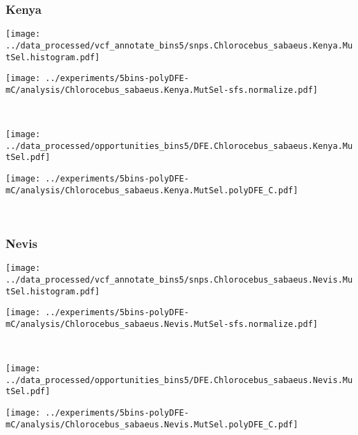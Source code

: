 \subsubsection{Kenya}

\begin{minipage}{0.49\linewidth}
    \texttt{[image: ../data\_processed/vcf\_annotate\_bins5/snps.Chlorocebus\_sabaeus.Kenya.MutSel.histogram.pdf]}
\end{minipage}
\begin{minipage}{0.49\linewidth}
    \texttt{[image: ../experiments/5bins-polyDFE-mC/analysis/Chlorocebus\_sabaeus.Kenya.MutSel-sfs.normalize.pdf]}
\end{minipage}
\\
\begin{minipage}{0.49\linewidth}
    \texttt{[image: ../data\_processed/opportunities\_bins5/DFE.Chlorocebus\_sabaeus.Kenya.MutSel.pdf]}
\end{minipage}
\begin{minipage}{0.49\linewidth}
    \texttt{[image: ../experiments/5bins-polyDFE-mC/analysis/Chlorocebus\_sabaeus.Kenya.MutSel.polyDFE\_C.pdf]}
\end{minipage}
\\

\subsubsection{Nevis}

\begin{minipage}{0.49\linewidth}
    \texttt{[image: ../data\_processed/vcf\_annotate\_bins5/snps.Chlorocebus\_sabaeus.Nevis.MutSel.histogram.pdf]}
\end{minipage}
\begin{minipage}{0.49\linewidth}
    \texttt{[image: ../experiments/5bins-polyDFE-mC/analysis/Chlorocebus\_sabaeus.Nevis.MutSel-sfs.normalize.pdf]}
\end{minipage}
\\
\begin{minipage}{0.49\linewidth}
    \texttt{[image: ../data\_processed/opportunities\_bins5/DFE.Chlorocebus\_sabaeus.Nevis.MutSel.pdf]}
\end{minipage}
\begin{minipage}{0.49\linewidth}
    \texttt{[image: ../experiments/5bins-polyDFE-mC/analysis/Chlorocebus\_sabaeus.Nevis.MutSel.polyDFE\_C.pdf]}
\end{minipage}
\\

